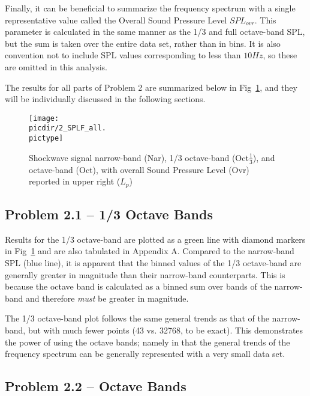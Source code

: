 \documentclass[twocolumn,10pt]{asme2ej}
\begin{document}
Finally, it can be beneficial to summarize the frequency spectrum with a single representative value called the Overall Sound Pressure Level $SPL_{ovr}$.  This parameter is calculated in the same manner as the 1/3 and full octave-band SPL, but the sum is taken over the entire data set, rather than in bins.  It is also convention not to include SPL values corresponding to less than $10Hz$, so these are omitted in this analysis.

The results for all parts of Problem 2 are summarized below in Fig~\ref{Bands}, and they will be individually discussed in the following sections.

\begin{figure}[htb]
\begin{center}
\texttt{[image: \\picdir/2\_SPLF\_all.\\pictype]}
\caption{Shockwave signal narrow-band (Nar), 1/3 octave-band (Oct$\frac{1}{3}$), and octave-band (Oct), with overall Sound Pressure Level (Ovr) reported in upper right ($L_p$)}
\label{Bands}
\end{center}
\end{figure}


\subsection{Problem 2.1 -- 1/3 Octave Bands}

Results for the 1/3 octave-band are plotted as a green line with diamond markers in Fig~\ref{Bands} and are also tabulated in Appendix A.  Compared to the narrow-band SPL (blue line), it is apparent that the binned values of the 1/3 octave-band are generally greater in magnitude than their narrow-band counterparts.  This is because the octave band is calculated as a binned sum over bands of the narrow-band and therefore \emph{must} be greater in magnitude.

The 1/3 octave-band plot follows the same general trends as that of the narrow-band, but with much fewer points (43 vs. 32768, to be exact).  This demonstrates the power of using the octave bands; namely in that the general trends of the frequency spectrum can be generally represented with a very small data set.

\subsection{Problem 2.2 -- Octave Bands}
\end{document}
